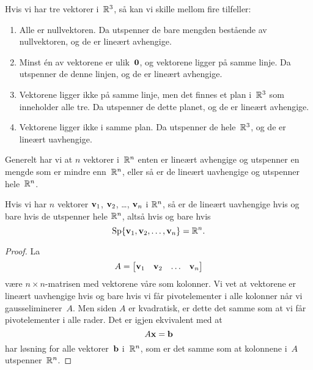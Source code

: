 Hvis vi har tre vektorer i~$\mathbb{R}^3$, så kan vi skille mellom fire
tilfeller:
\begin{enumerate}
\item Alle er nullvektoren.  Da utspenner de bare mengden bestående av
nullvektoren, og de er lineært avhengige.
\item Minst én av vektorene er ulik~$\mathbf{0}$, og vektorene ligger på
samme linje.  Da utspenner de denne linjen, og de er lineært
avhengige.
\item Vektorene ligger ikke på samme linje, men det finnes et plan
i~$\mathbb{R}^3$ som inneholder alle tre.  Da utspenner de dette planet, og de
er lineært avhengige.
\item Vektorene ligger ikke i samme plan.  Da utspenner de
hele~$\mathbb{R}^3$, og de er lineært uavhengige.
\end{enumerate}

Generelt har vi at $n$ vektorer i~$\mathbb{R}^n$ enten er lineært avhengige og
utspenner en mengde som er mindre enn~$\mathbb{R}^n$, eller så er de lineært
uavhengige og utspenner hele~$\mathbb{R}^n$.

\begin{thm}
\label{thm:linuavhspan}
Hvis vi har $n$ vektorer $\mathbf{v}_1$, $\mathbf{v}_2$, \ldots, $\mathbf{v}_n$ i
$\mathbb{R}^n$, så er de lineært uavhengige hvis og bare hvis de utspenner
hele $\mathbb{R}^n$, altså hvis og bare hvis
\[
\operatorname{Sp} \{ \mathbf{v}_1, \mathbf{v}_2, \ldots, \mathbf{v}_n \} = \mathbb{R}^n.
\]
\end{thm}
\begin{proof}
La
\[
A = \begin{bmatrix} \mathbf{v}_1 & \mathbf{v}_2 & \ldots & \mathbf{v}_n \end{bmatrix}
\]
være $n \times n$-matrisen med vektorene våre som kolonner.  Vi vet at
vektorene er lineært uavhengige hvis og bare hvis vi får
pivotelementer i alle kolonner når vi gausseliminerer~$A$.  Men siden
$A$ er kvadratisk, er dette det samme som at vi får pivotelementer i
alle rader.  Det er igjen ekvivalent med at
\[
A \mathbf{x} = \mathbf{b}
\]
har løsning for alle vektorer~$\mathbf{b}$ i~$\mathbb{R}^n$, som er det samme som
at kolonnene i~$A$ utspenner~$\mathbb{R}^n$.
\end{proof}


\kapittelslutt
